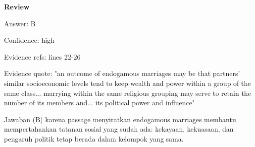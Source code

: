 \documentclass[12pt]{article}
\begin{document}
\begingroup
\setlength{\parskip}{0pt}
\setlength{\parindent}{0pt}
\textbf{Review}\par
Answer: B\par
Confidence: high\par
Evidence refs: lines 22-26\par
Evidence quote: "an outcome of endogamous marriages may be that partners' similar socioeconomic levels tend to keep wealth and power within a group of the same class... marrying within the same religious grouping may serve to retain the number of its members and... its political power and influence"\par
Jawaban (B) karena passage menyiratkan endogamous marriages membantu mempertahankan tatanan sosial yang sudah ada: kekayaan, kekuasaan, dan pengaruh politik tetap berada dalam kelompok yang sama.\par
\endgroup
\par
\vspace{0.25\baselineskip}
\end{document}
